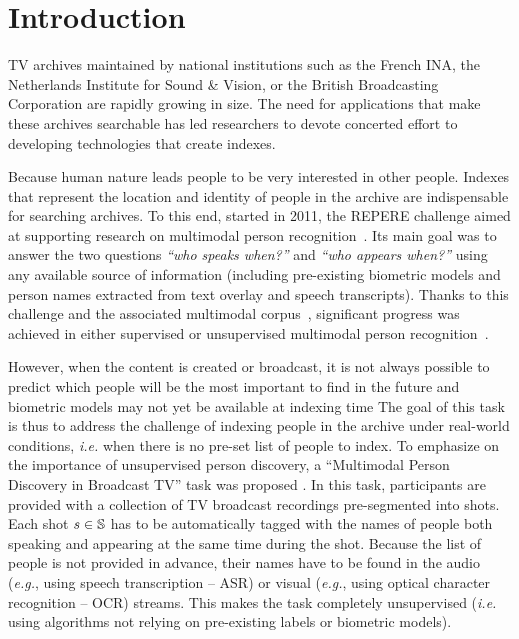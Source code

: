 \section{Introduction}

TV archives maintained by national institutions such as the French INA, the Netherlands Institute for Sound \& Vision, or the British Broadcasting Corporation are rapidly growing in size. The need for applications that make these archives searchable has led researchers to devote concerted effort to developing technologies that create indexes.

Because human nature leads people to be very interested in other people.
Indexes that represent the location and identity of people in the archive are indispensable for searching archives.
%
To this end, started in 2011, the REPERE challenge aimed at supporting research on multimodal person recognition~\cite{BERNARD--SLAM--2013, KAHN--CBMI--2012}. Its main goal was to answer the two questions \emph{``who speaks when?''} and \emph{``who appears when?''} using any available source of information (including pre-existing biometric models and person names extracted from text overlay and speech transcripts). 
%
Thanks to this challenge and the associated multimodal corpus~\cite{GIRAUDEL--LREC--2012}, significant progress was achieved in either supervised or unsupervised multimodal person recognition~\cite{BECHET--INTERSPEECH--2014, BENDRIS--CBMI--2013, BREDIN--ODYSSEY--2014, BREDIN--INTERSPEECH--2013, BREDIN--SLAM--2013, BREDIN--IJMIR--2014, FAVRE--SLAM--2013, GAY--CBMI--2014, POIGNANT--ASLP--2015, POIGNANT--SLAM--2013, POIGNANT--INTERSPEECH--2012, POIGNANT--MTAP--2015, ROUVIER--CBMI--2014}.

However, when the content is created or broadcast, it is not always possible to predict which people will be the most important to find in the future and biometric models may not yet be available at indexing time The goal of this task is thus to address the challenge of indexing people in the archive under real-world conditions, \emph{i.e.} when there is no pre-set list of people to index.
%
To emphasize on the importance of unsupervised person discovery, a ``Multimodal Person Discovery in Broadcast TV'' task was proposed \cite{POIGNANT--MEDIAEVAL--2015,tocite}. In this task, participants are provided with a collection of TV broadcast recordings pre-segmented into shots. Each shot $s \in \mathbb{S}$ has to be automatically tagged with the names of people both speaking and appearing at the same time during the shot.
%
Because the list of people is not provided in advance, their names have to be found in the audio (\emph{e.g.}, using speech transcription -- ASR) or visual (\emph{e.g.}, using optical character recognition -- OCR) streams.
%
This makes the task completely unsupervised (\emph{i.e.} using algorithms not relying on pre-existing labels or biometric models).

